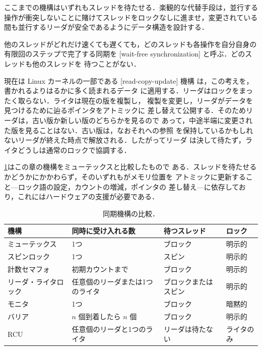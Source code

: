 \documentclass[../main.tex]{subfiles}
\begin{document}
ここまでの機構はいずれもスレッドを待たせる．楽観的な代替手段は，並行する
操作が衝突しないことに賭けてスレッドをロックなしに進ませ，変更されている
間も並行するリーダが安全であるようにデータ構造を設計する．

\begin{definition}[ウェイトフリー同期]
  他のスレッドがどれだけ速くても遅くても，どのスレッドも各操作を自分自身の
  有限回のステップで完了する同期を
  [wait-free
  synchronization] \cite{herlihy1991}と呼ぶ．どのスレッドも他のスレッドを
  待つことがない．
\end{definition}

現在は Linux カーネルの一部である [read-copy-update]%
 機構
\cite{mckenney1998} は，この考えを，書かれるよりはるかに多く読まれるデータ
に適用する．リーダはロックをまったく取らない．ライタは現在の版を複製し，
複製を変更し，リーダがデータを見つけるために辿るポインタをアトミックに
差し替えて公開する．そのためリーダは，古い版か新しい版のどちらかを見るので
あって，中途半端に変更された版を見ることはない．古い版は，なおそれへの参照
を保持しているかもしれないリーダが終えた時点で解放される．したがってリーダ
は決して待たず，ライタどうしは通常のロックで協調する．

\cref{tab:l10-constructs}はこの章の機構をミューテックスと比較したもので
ある．スレッドを待たせるかどうかにかかわらず，そのいずれもがメモリ位置を
アトミックに更新すること---ロック語の設定，カウントの増減，ポインタの
差し替え---に依存しており，これにはハードウェアの支援が必要である．

\begin{table}[htbp]
  \centering
  \caption{同期機構の比較．}
  \label{tab:l10-constructs}
  \small
  \begin{tabular}{@{}lp{32mm}p{30mm}l@{}}
    \toprule
    機構 & 同時に受け入れる数 & 待つスレッド & ロック \\
    \midrule
    ミューテックス       & 1つ                      & ブロック   & 明示的 \\
    スピンロック         & 1つ                      & スピン     & 明示的 \\
    計数セマフォ         & 初期カウントまで         & ブロック   & 明示的 \\
    リーダ・ライタロック & 任意個のリーダまたは1つのライタ
                                                    & ブロックまたはスピン
                                                                 & 明示的 \\
    モニタ               & 1つ                      & ブロック   & 暗黙的 \\
    バリア               & $n$ 個到着したら $n$ 個  & ブロック   & 明示的 \\
    RCU                  & 任意個のリーダと1つのライタ
                                                    & リーダは待たない
                                                                 & ライタのみ \\
    \bottomrule
  \end{tabular}
\end{table}
\end{document}
